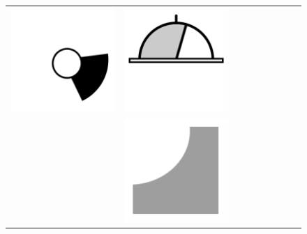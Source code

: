 \documentclass[doc]{apa6}
\newcommand{\stimulusscale}{.1}
\begin{document}
\begin{figure}[t]
\begin{center}
\begin{tabular}{c|cccccccc}
\includegraphics[scale=\stimulusscale]{./set35stim55.png} &
\includegraphics[scale=\stimulusscale]{./set36stim55.png}\\[6pt]
 \raisebox{.75cm}{75}  &
\includegraphics[scale=\stimulusscale]{./set29stim75.png} &

\end{tabular}
\end{center}
\end{figure}
\end{document}
